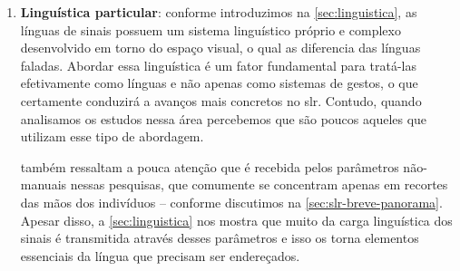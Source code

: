 \begin{enumerate}



      \item \textbf{Linguística particular}: conforme introduzimos na \autoref{sec:linguistica}, as línguas de sinais possuem um sistema linguístico próprio e complexo desenvolvido em torno do espaço visual, o qual as diferencia das línguas faladas.
            Abordar essa linguística é um fator fundamental para tratá-las efetivamente como línguas e não apenas como sistemas de gestos, o que certamente conduzirá a avanços mais concretos no \acrshort{slr}. Contudo, quando analisamos os estudos nessa área percebemos que são poucos aqueles que utilizam esse tipo de abordagem.

             também ressaltam a pouca atenção que é recebida pelos parâmetros não-manuais nessas pesquisas, que comumente se concentram apenas em recortes das mãos dos indivíduos -- conforme discutimos na \autoref{sec:slr-breve-panorama}.
            Apesar disso, a \autoref{sec:linguistica} nos mostra que muito da carga linguística dos sinais é transmitida através desses parâmetros e isso os torna elementos essenciais da língua que precisam ser endereçados.




\end{enumerate}
